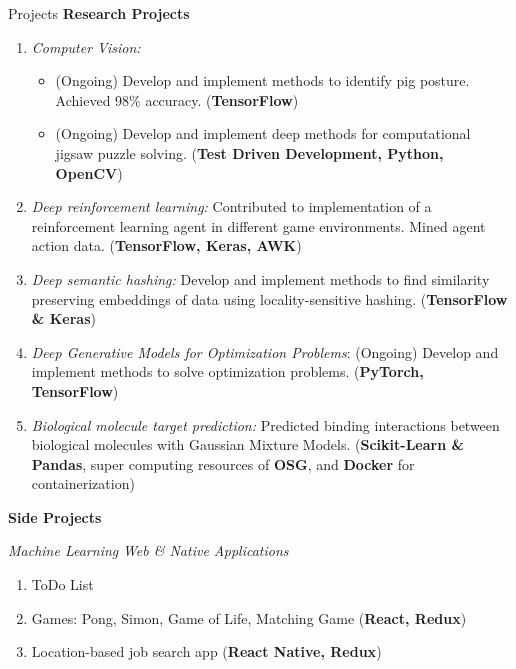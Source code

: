 \documentclass{resume} %
\newenvironment{cvEnum}
{ \begin{enumerate}[]
    \setlength{\itemsep}{0pt}
    \setlength{\parskip}{0pt}
    \setlength{\parsep}{0pt}     }
{ \end{enumerate}                  }
\begin{document}
\begin{rSection}{Projects}
{\bf Research Projects}
\begin{cvEnum}
\item {\em Computer Vision:}
  \begin{itemize}
    \item (Ongoing) Develop and implement methods to
      identify pig posture. Achieved 98\% accuracy. (\textbf{TensorFlow})
     \item (Ongoing) Develop and implement deep methods for computational jigsaw
       puzzle solving. (\textbf{Test Driven Development, Python, OpenCV})

      \end{itemize}
    \item {\em Deep reinforcement learning:} Contributed to
      implementation of a reinforcement learning agent in different
      game environments.  Mined agent action data. (\textbf{TensorFlow,
        Keras, AWK})

    \item {\em Deep semantic hashing:} Develop and implement methods
      to find similarity preserving embeddings of data using
      locality-sensitive hashing. (\textbf{TensorFlow \& Keras})

    \item {\em Deep Generative Models for Optimization Problems}: (Ongoing) Develop and implement methods to solve optimization problems. (\textbf{PyTorch, TensorFlow})

    \item {\em Biological molecule target prediction:} Predicted
      binding interactions between biological molecules with Gaussian
      Mixture Models. (\textbf{Scikit-Learn \& Pandas}, super computing
      resources of \textbf{OSG}, and \textbf{Docker} for containerization)

\end{cvEnum}
\newpage
{\bf Side Projects}

{\em Machine Learning}
{\em Web \& Native Applications}
\begin{cvEnum}
  \item ToDo List
  \item Games: Pong, Simon, Game of Life, Matching Game (\textbf{React, Redux})
  \item Location-based job search app  (\textbf{React Native, Redux})


\end{cvEnum}
\end{rSection}
\end{document}
